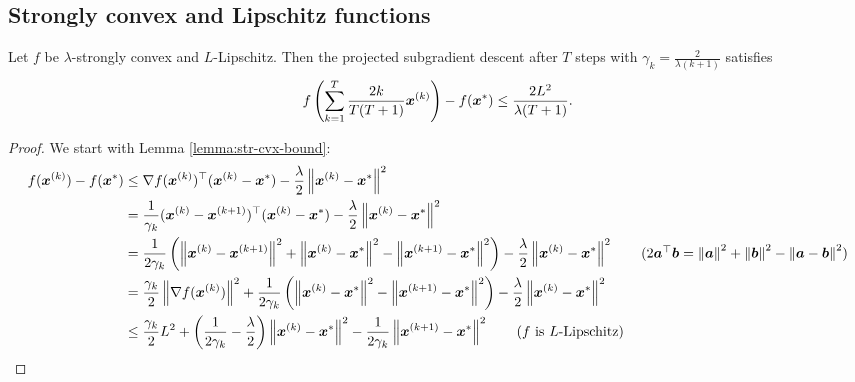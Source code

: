 \documentclass{article}
\begin{document}
{\subsection{Strongly convex and Lipschitz functions}
\begin{thm}\label{thm:str-cvx-lipschitz}
Let $f$ be $\lambda$-strongly convex and $L$-Lipschitz. Then the projected subgradient descent after $T$ steps with $\gamma_k = \frac{2}{\lambda(k+1)}$ satisfies  
\[
	f\left(\sum_{k=1}^T \frac{2k}{T(T+1)} {\bm{x}}^{(k)}\right) - f({\bm{x}}^\ast) \leq \frac{2 L^2}{\lambda(T+1)}.
\]
\end{thm}

\begin{proof}
We start with Lemma \ref{lemma:str-cvx-bound}:
\begin{align*}
    f(\vx^{(k)}) - f(\vx^\ast) &\leq \nabla f(\vx^{(k)})^\top (\vx^{(k)} - \vx^\ast) - \frac{\lambda}{2} \norm{\vx^{(k)} - \vx^\ast}^2 \\
    &= \frac{1}{\gamma_k} (\vx^{(k)} - \vx^{(k+1)})^\top (\vx^{(k)} - \vx^\ast) - \frac{\lambda}{2} \norm{\vx^{(k)} - \vx^\ast}^2 \\
    &= \frac{1}{2\gamma_k} \parens{\norm{\vx^{(k)} - \vx^{(k+1)}}^2 + \norm{\vx^{(k)} - \vx^\ast}^2 - \norm{\vx^{(k+1)} - \vx^\ast}^2} - \frac{\lambda}{2} \norm{\vx^{(k)} - \vx^\ast}^2 \tag{$2 \va^\top \vb = \norm{\va}^2 + \norm{\vb}^2 - \norm{\va - \vb}^2$} \\
    &= \frac{\gamma_k}{2} \norm{\nabla f(\vx^{(k)})}^2 + \frac{1}{2\gamma_k} \parens{\norm{\vx^{(k)} - \vx^\ast}^2 - \norm{\vx^{(k+1)} - \vx^\ast}^2} - \frac{\lambda}{2} \norm{\vx^{(k)} - \vx^\ast}^2 \\
    &\leq \frac{\gamma_k}{2} L^2 + \parens{\frac{1}{2\gamma_k} - \frac{\lambda}{2}} \norm{\vx^{(k)} - \vx^\ast}^2 - \frac{1}{2\gamma_k} \norm{\vx^{(k+1)} - \vx^\ast}^2 \tag{$f$ is $L$-Lipschitz}
\end{align*}


\end{proof}}
\end{document}
